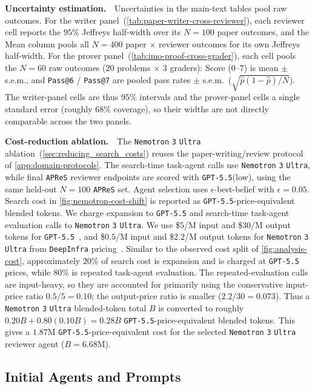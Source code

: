 \documentclass{paper}
\newcommand{\gptlow}{\texttt{GPT-5.5}\xspace}
\newcommand{\nemotronultra}{\texttt{Nemotron} \texttt{3} \texttt{Ultra}\xspace}
\newcommand{\apres}{\texttt{APReS}\xspace}
\begin{document}
\noindent\textbf{Uncertainty estimation.}~~Uncertainties in the main-text tables pool raw outcomes. For the writer panel~(\cref{tab:paper-writer-cross-reviewer}), each reviewer cell reports the $95\%$ Jeffreys half-width over its $N=100$ paper outcomes, and the Mean column pools all $N=400$ paper $\times$ reviewer outcomes for its own Jeffreys half-width. For the prover panel~(\cref{tab:imo-proof-cross-grader}), each cell pools the $N=60$ raw outcomes ($20$ problems $\times$ $3$ graders): Score ($0$--$7$) is mean $\pm$ s.e.m., and \texttt{Pass@6} / \texttt{Pass@7} are pooled pass rates $\pm$ s.e.m.\ ($\sqrt{\hat p(1-\hat p)/N}$). The writer-panel cells are thus $95\%$ intervals and the prover-panel cells a single standard error (roughly $68\%$ coverage), so their widths are not directly comparable across the two panels.

\noindent\textbf{Cost-reduction ablation.}~~The \nemotronultra ablation~(\cref{sec:reducing_search_costs}) reuses the paper-writing/review protocol of \cref{app:domain-protocols}. The search-time task-agent calls use \nemotronultra, while final \apres reviewer endpoints are scored with \gptlow (low), using the same held-out $N=100$ \apres set. Agent selection uses $\epsilon$-best-belief with $\epsilon=0.05$. Search cost in \cref{fig:nemotron-cost-shift} is reported as \gptlow-price-equivalent blended tokens. We charge expansion to \gptlow and search-time task-agent evaluation calls to \nemotronultra. We use \$$5$/M input and \$$30$/M output tokens for \gptlow~\citep{openai2026pricing}, and \$$0.5$/M input and \$$2.2$/M output tokens for \nemotronultra from \texttt{DeepInfra} pricing~\citep{deepinfra2026pricing}. Similar to the observed cost split of \cref{fig:analysis-cost}, approximately $20\%$ of search cost is expansion and is charged at \gptlow prices, while $80\%$ is repeated task-agent evaluation. The repeated-evaluation calls are input-heavy, so they are accounted for primarily using the conservative input-price ratio $0.5/5=0.10$; the output-price ratio is smaller ($2.2/30=0.073$). Thus a \nemotronultra blended-token total $B$ is converted to roughly $0.20B + 0.80(0.10B)=0.28B$ \gptlow-price-equivalent blended tokens. This gives a $1.87$M \gptlow-price-equivalent cost for the selected \nemotronultra reviewer agent ($B=6.68$M).

\subsection{Initial Agents and Prompts}
\label{app:prompts}
\end{document}
